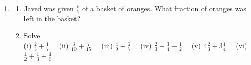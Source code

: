 \documentclass[a4paper,leqno,12pt]{amsart}
\begin{document}
\begin{enumerate}
\item 
\begin{enumerate}
\item Javed was given $\frac{5}{7}$ of a basket of oranges. What fraction of oranges was left in the basket?

\item Solve\\
(i) $\frac{2}{3} + \frac{1}{7} \quad$ (ii) $\frac{3}{10} + \frac{7}{15} \quad$ (iii) $\frac{4}{9} + \frac{2}{7} \quad$ (iv) $\frac{2}{3} + \frac{3}{4} + \frac{1}{2} \quad$ (v) $4\frac{2}{3} + 3\frac{1}{4} \quad$
(vi) $\frac{1}{2} + \frac{1}{3} + \frac{1}{6}$
\end{enumerate}
\end{enumerate}


\end{document}

